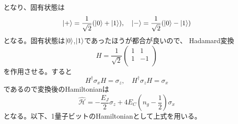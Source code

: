         となり、固有状態は
        \begin{equation}
            \ket{+}=\frac{1}{\sqrt2}(\ket{0}+\ket{1}),\quad \ket{-}=\frac{1}{\sqrt2}(\ket{0}-\ket{1})
        \end{equation}
        となる。固有状態は$\ket{0}$,$\ket{1}$であったほうが都合が良いので、
        Hadamard変換
        \begin{equation}
            H=\frac{1}{\sqrt2}\left(
            \begin{array}{cc}
                1 & 1 \\
                1 & -1 \\
            \end{array}
            \right)
        \end{equation}
        を作用させる。すると
        \begin{equation}
        H^\dagger \sigma_x H = \sigma_z, \quad H^\dagger \sigma_z H = \sigma_x
        \end{equation}
        であるので変換後のHamiltonianは
        \begin{equation}
            \hat{\mathcal{H}}=-\frac{E_J}{2}\sigma_z + 4E_C ( n_g-\frac{1}{2} ) \sigma_x
        \end{equation}
        となる。以下、1量子ビットのHamiltonianとして上式を用いる。

